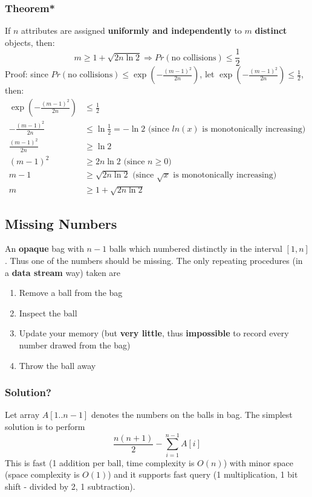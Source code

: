 \documentclass[a4paper]{article}
\begin{document}
\subsubsection{Theorem*}

If $n$ attributes are assigned \textbf{uniformly and independently} to $m$ \textbf{distinct} objects, then:
$$m \geq 1 + \sqrt{2n\ln{2}} \Rightarrow Pr(\text{no collisions}) \leq \frac{1}{2}$$
Proof: since $Pr(\text{no collisions}) \leq \exp(-\frac{(m - 1)^2}{2n})$, let $\exp(-\frac{(m - 1)^2}{2n}) \leq \frac{1}{2}$, then:
\begin{equation*}
\begin{split}
\exp(-\frac{(m - 1)^2}{2n}) & \leq \frac{1}{2} \\
-\frac{(m - 1)^2}{2n} & \leq \ln{\frac{1}{2}} = -\ln{2} \text{ (since $ln{(x)}$ is monotonically increasing)} \\
\frac{(m - 1)^2}{2n} & \geq \ln{2} \\
(m - 1)^2 & \geq 2n\ln{2} \text{ (since $n \geq 0$)} \\
m - 1 & \geq \sqrt{2n\ln{2}} \text{ (since $\sqrt{x}$ is monotonically increasing)} \\
m & \geq 1 + \sqrt{2n\ln{2}}
\end{split}
\end{equation*}

\subsection{Missing Numbers}

An \textbf{opaque} bag with $n - 1$ balls which numbered distinctly in the interval $[1, n]$. Thus one of the numbers should be missing. The only repeating procedures (in a \textbf{data stream} way) taken are
\begin{enumerate}
    \item Remove a ball from the bag
    \item Inspect the ball
    \item Update your memory (but \textbf{very little}, thus \textbf{impossible} to record every number drawed from the bag)
    \item Throw the ball away
\end{enumerate}

\subsubsection{Solution?}

Let array $A[1..n-1]$ denotes the numbers on the balls in bag. The simplest solution is to perform
$$\frac{n(n+1)}{2}-\sum_{i=1}^{n-1}A[i]$$
This is fast (1 addition per ball, time complexity is $O(n)$) with minor space (space complexity is $O(1)$) and it supports fast query (1 multiplication, 1 bit shift - divided by 2, 1 subtraction).
\end{document}
